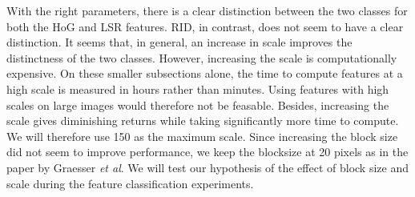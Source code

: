 With the right parameters, there is a clear distinction between the two classes for both the HoG and LSR features. RID, in contrast, does not seem to have a clear distinction. It seems that, in general, an increase in scale improves the distinctness of the two classes. However, increasing the scale is computationally expensive. On these smaller subsections alone, the time to compute features at a high scale is measured in hours rather than minutes. Using features with high scales on large images would therefore not be feasable. Besides, increasing the scale gives diminishing returns while taking significantly more time to compute. We will therefore use 150 as the maximum scale.
Since increasing the block size did not seem to improve performance, we keep the blocksize at 20 pixels as in the paper by Graesser \textit{et al}. We will test our hypothesis of the effect of block size and scale during the feature classification experiments.


